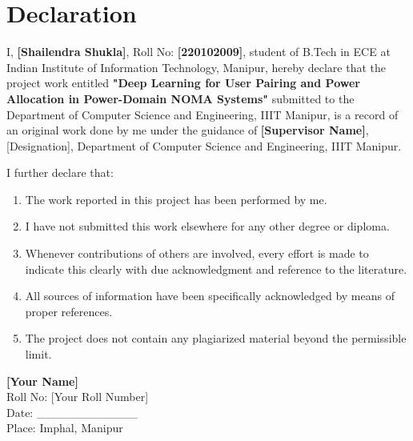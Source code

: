 \chapter*{Declaration}

\vspace{1cm}

I, \textbf{[Shailendra Shukla]}, Roll No: \textbf{[220102009]}, student of B.Tech in ECE at Indian Institute of Information Technology, Manipur, hereby declare that the project work entitled \textbf{"Deep Learning for User Pairing and Power Allocation in Power-Domain NOMA Systems"} submitted to the Department of Computer Science and Engineering, IIIT Manipur, is a record of an original work done by me under the guidance of \textbf{[Supervisor Name]}, [Designation], Department of Computer Science and Engineering, IIIT Manipur.

\vspace{1cm}

I further declare that:
\begin{enumerate}
    \item The work reported in this project has been performed by me.
    \item I have not submitted this work elsewhere for any other degree or diploma.
    \item Whenever contributions of others are involved, every effort is made to indicate this clearly with due acknowledgment and reference to the literature.
    \item All sources of information have been specifically acknowledged by means of proper references.
    \item The project does not contain any plagiarized material beyond the permissible limit.
\end{enumerate}

\vspace{2cm}

\begin{flushright}
\textbf{[Your Name]} \\
Roll No: [Your Roll Number] \\
Date: \_\_\_\_\_\_\_\_\_\_\_\_ \\
Place: Imphal, Manipur
\end{flushright}

\newpage
